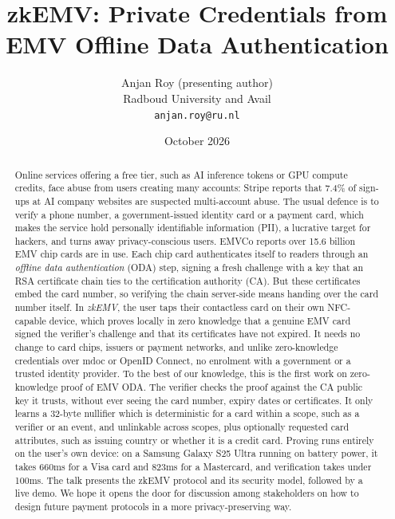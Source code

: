 \documentclass[10pt,a4paper]{article}
\title{zkEMV: Private Credentials from EMV Offline Data Authentication}
\author{Anjan Roy (presenting author)\\Radboud University and Avail\\\texttt{anjan.roy@ru.nl}}
\date{October 2026}
\begin{document}
\maketitle

\begin{abstract}
  Online services offering a free tier, such as AI inference tokens or GPU compute credits, face abuse from users creating many accounts: Stripe reports that 7.4\% of sign-ups at AI company websites are suspected multi-account abuse.
  The usual defence is to verify a phone number, a government-issued identity card or a payment card, which makes the service hold personally identifiable information (PII), a lucrative target for hackers, and turns away privacy-conscious users.
  EMVCo reports over 15.6 billion EMV chip cards are in use.
  Each chip card authenticates itself to readers through an \emph{offline data authentication} (ODA) step, signing a fresh challenge with a key that an RSA certificate chain ties to the certification authority (CA).
  But these certificates embed the card number, so verifying the chain server-side means handing over the card number itself.
  In \emph{zkEMV}, the user taps their contactless card on their own NFC-capable device, which proves locally in zero knowledge that a genuine EMV card signed the verifier's challenge and that its certificates have not expired.
  It needs no change to card chips, issuers or payment networks, and unlike zero-knowledge credentials over mdoc or OpenID Connect, no enrolment with a government or a trusted identity provider.
  To the best of our knowledge, this is the first work on zero-knowledge proof of EMV ODA.
  The verifier checks the proof against the CA public key it trusts, without ever seeing the card number, expiry dates or certificates.
  It only learns a 32-byte nullifier which is deterministic for a card within a scope, such as a verifier or an event, and unlinkable across scopes, plus optionally requested card attributes, such as issuing country or whether it is a credit card.
  Proving runs entirely on the user's own device: on a Samsung Galaxy S25 Ultra running on battery power, it takes 660ms for a Visa card and 823ms for a Mastercard, and verification takes under 100ms.
  The talk presents the zkEMV protocol and its security model, followed by a live demo.
  We hope it opens the door for discussion among stakeholders on how to design future payment protocols in a more privacy-preserving way.
\end{abstract}
\end{document}
